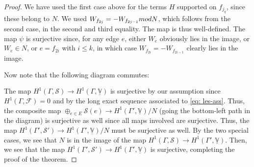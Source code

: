 \documentclass[10pt,a4paper]{amsart}
\begin{document}
\begin{proof}
We have used the first case above for the terms $H$ supported on $f_{j_{q}}$, since these belong to $N.$ We used $W_{f_{2j}} = -W_{f_{2j -1}} \textup{mod } N$, which follows from the second case, in the second and third equality. The map is thus well-defined. The map $\psi$ is surjective since, for any edge $e$, either $W_{e}$ obviously lies in the image, or $W_{e} \in N$, or $e=f_{2i}$ with $i\leq k$, in which case $W_{f_{2i}} = -W_{f_{2i -1}}$ clearly lies in the image.

Now note that the following diagram commutes:
\begin{figure}[h!]
    \centering
{}
\end{figure}

The map $H^{1}(\Gamma, \mathcal{S})\rightarrow H^{1}(\Gamma, \underline{\mathbb{V}})$ is surjective by our assumption since $H^{1}(\Gamma, \mathcal{F}) = 0$ and by the long exact sequence associated to \eqref{eq: les-ass}. Thus, the composite map $\oplus_{e \in E} \mathcal{S}(e) \rightarrow H^{1}(\Gamma', \underline{\mathbb{V}})/N$ (going the bottom-left path in the diagram) is surjective as well since all maps involved are surjective. Thus, the map $H^{1}(\Gamma', \mathcal{S}') \rightarrow  H^{1}(\Gamma', \underline{\mathbb{V}})/ N$ must be surjective as well. By the two special cases, we see that $N$ is in the image of the map $H^{1}(\Gamma, \mathcal{S}) \rightarrow H^{1}(\Gamma', \underline{\mathbb{V}})$. Then, we see that the map $H^{1}(\Gamma', \mathcal{S}') \rightarrow H^{1}(\Gamma', \underline{\mathbb{V}})$ is surjective, completing the proof of the theorem.
\end{proof}
\end{document}

